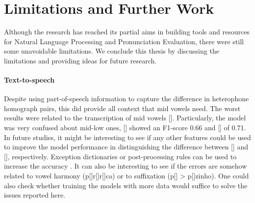 \section*{Limitations and Further Work}\label{sec:limitations-further}

Although the research has reached its partial aims in building tools and resources for Natural Language Processing and Pronunciation Evaluation, there were still some unavoidable limitations. We conclude this thesis by discussing the limitations and providing ideas for future research.

\paragraph*{Text-to-speech}
Despite using part-of-speech information to capture the difference in heterophone homograph pairs, this did provide all context that mid vowels need. The worst results were related to the transcription of mid vowels []. Particularly, the model was very confused about mid-low ones, [] showed an F1-score 0.66 and [] of 0.71. In future studies, it might be interesting to see if any other features could be used to improve the model performance in distinguishing the difference between [] and [], respectively. Exception dictionaries or post-processing rules can be used to increase the accuracy \cite{Shulby2013}. It can also be interesting to see if the errors are somehow related to vowel harmony (p[]r[]r[]ca) or to suffixation (p[] > p[]zinho). One could also check whether training the models with more data would suffice to solve the issues reported here.


